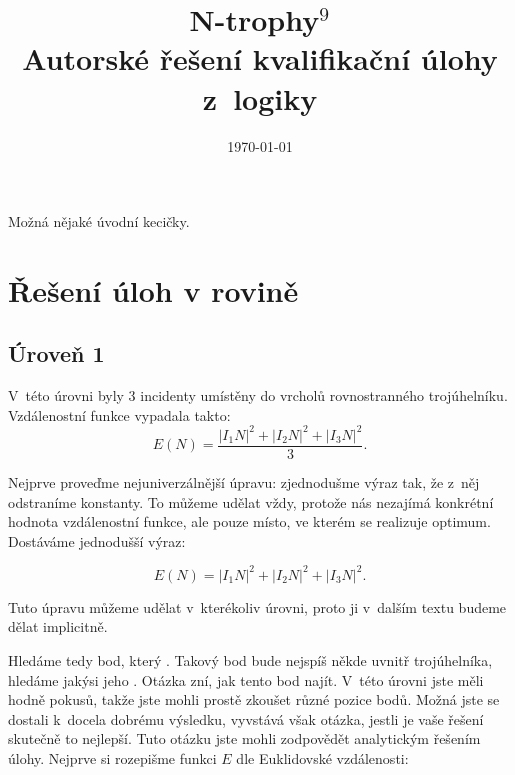 \documentclass[12pt,a4paper]{article}
\begin{document}
\pagestyle{fancy}     %
\setcounter{page}{1}  %

\fancyhead[R]{}

\title{N-trophy$^9$\\Autorské řešení kvalifikační úlohy z~logiky}
\date{\today}
\maketitle

\setlength{\parindent}{0cm}
\setlength{\parskip}{3mm plus2pt minus2pt}

Možná nějaké úvodní kecičky.

\section*{Řešení úloh v rovině}
\subsection*{Úroveň 1}

V~této úrovni byly 3 incidenty umístěny do vrcholů rovnostranného trojúhelníku.
Vzdálenostní funkce vypadala takto:
$$E(N) = \frac{|I_1N|^2 + |I_2N|^2 + |I_3N|^2}{3}.$$

Nejprve proveďme nejuniverzálnější úpravu: zjednodušme výraz tak, že z~něj
odstraníme konstanty. To můžeme udělat vždy, protože nás nezajímá konkrétní
hodnota vzdálenostní funkce, ale pouze místo, ve kterém se realizuje optimum.
Dostáváme jednodušší výraz:

$$E(N) = |I_1N|^2 + |I_2N|^2 + |I_3N|^2.$$

Tuto úpravu můžeme udělat v~kterékoliv úrovni, proto ji v~dalším textu budeme
dělat implicitně.

Hledáme tedy bod, který . Takový bod bude
nejspíš někde uvnitř trojúhelníka, hledáme jakýsi jeho . Otázka zní,
jak tento bod najít. V~této úrovni jste měli hodně pokusů, takže jste mohli
prostě zkoušet různé pozice bodů. Možná jste se dostali k~docela dobrému
výsledku, vyvstává však otázka, jestli je vaše řešení skutečně to nejlepší.
Tuto otázku jste mohli zodpovědět analytickým řešením úlohy. Nejprve si rozepišme
funkci $E$ dle Euklidovské vzdálenosti:
\end{document}

